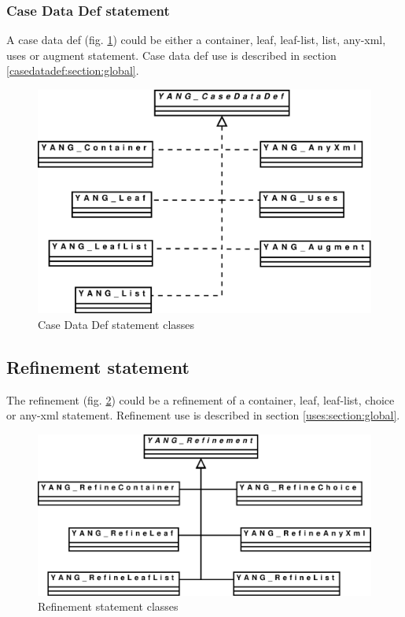 \documentclass[a4paper]{article}
\begin{document}
\subsubsection{Case Data Def statement}
\label{casedatadef:section:detail}

A case data def (fig.  \ref{casedatadef}) could be either a container,
leaf, leaf-list,  list, any-xml, uses or augment  statement. Case data
def use is described in section \ref{casedatadef:section:global}.
\begin{figure}[htbp]
\begin{center}
\includegraphics[scale = .3]{casedatadef.eps}
\end{center}
\caption{Case Data Def  statement classes}
\label{casedatadef}
\end{figure}



\subsection{Refinement statement}
\label{refinement:section:detail}

The  refinement (fig.  \ref{refinement})  could be  a refinement  of a
container,  leaf, leaf-list, choice  or any-xml  statement. Refinement
use is described in section \ref{uses:section:global}.
\begin{figure}[htbp]
\begin{center}
\includegraphics[scale = .3]{refinement.eps}
\end{center}
\caption{Refinement statement classes}
\label{refinement}
\end{figure}
\end{document}
